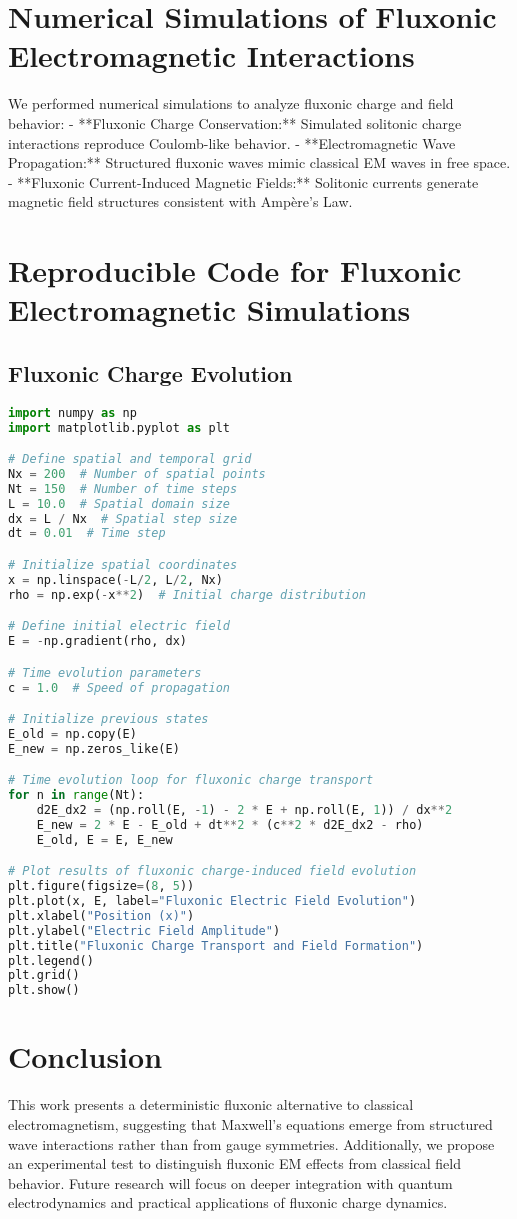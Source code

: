\documentclass{article}
\begin{document}
\section{Numerical Simulations of Fluxonic Electromagnetic Interactions}
We performed numerical simulations to analyze fluxonic charge and field behavior:
- **Fluxonic Charge Conservation:** Simulated solitonic charge interactions reproduce Coulomb-like behavior.
- **Electromagnetic Wave Propagation:** Structured fluxonic waves mimic classical EM waves in free space.
- **Fluxonic Current-Induced Magnetic Fields:** Solitonic currents generate magnetic field structures consistent with Ampère’s Law.

\section{Reproducible Code for Fluxonic Electromagnetic Simulations}
\subsection{Fluxonic Charge Evolution}
\begin{lstlisting}[language=Python]
import numpy as np
import matplotlib.pyplot as plt

# Define spatial and temporal grid
Nx = 200  # Number of spatial points
Nt = 150  # Number of time steps
L = 10.0  # Spatial domain size
dx = L / Nx  # Spatial step size
dt = 0.01  # Time step

# Initialize spatial coordinates
x = np.linspace(-L/2, L/2, Nx)
rho = np.exp(-x**2)  # Initial charge distribution

# Define initial electric field
E = -np.gradient(rho, dx)

# Time evolution parameters
c = 1.0  # Speed of propagation

# Initialize previous states
E_old = np.copy(E)
E_new = np.zeros_like(E)

# Time evolution loop for fluxonic charge transport
for n in range(Nt):
    d2E_dx2 = (np.roll(E, -1) - 2 * E + np.roll(E, 1)) / dx**2
    E_new = 2 * E - E_old + dt**2 * (c**2 * d2E_dx2 - rho)
    E_old, E = E, E_new

# Plot results of fluxonic charge-induced field evolution
plt.figure(figsize=(8, 5))
plt.plot(x, E, label="Fluxonic Electric Field Evolution")
plt.xlabel("Position (x)")
plt.ylabel("Electric Field Amplitude")
plt.title("Fluxonic Charge Transport and Field Formation")
plt.legend()
plt.grid()
plt.show()
\end{lstlisting}

\section{Conclusion}
This work presents a deterministic fluxonic alternative to classical electromagnetism, suggesting that Maxwell’s equations emerge from structured wave interactions rather than from gauge symmetries. Additionally, we propose an experimental test to distinguish fluxonic EM effects from classical field behavior. Future research will focus on deeper integration with quantum electrodynamics and practical applications of fluxonic charge dynamics.
\end{document}
